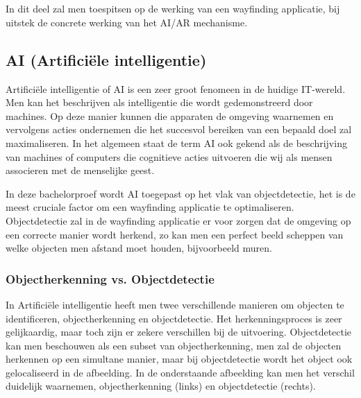 \chapter{}
\label{ch:stand-van-zaken}




In dit deel zal men toespitsen op de werking van een wayfinding applicatie, bij uitstek de concrete werking van het AI/AR mechanisme.

\section{AI (Artificiële intelligentie)}
Artificiële intelligentie of AI is een zeer groot fenomeen in de huidige IT-wereld. Men kan het beschrijven als intelligentie die wordt gedemonstreerd door machines. Op deze manier kunnen die apparaten de omgeving waarnemen en vervolgens acties ondernemen die het succesvol bereiken van een bepaald doel zal maximaliseren. In het algemeen staat de term AI ook gekend als de beschrijving van machines of computers die cognitieve acties uitvoeren die wij als mensen associeren met de menselijke geest. 

In deze bachelorproef wordt AI toegepast op het vlak van objectdetectie, het is de meest cruciale factor om een wayfinding applicatie te optimaliseren.
Objectdetectie zal in de wayfinding applicatie er voor zorgen dat de omgeving op een correcte manier wordt herkend, zo kan men een perfect beeld scheppen van welke objecten men afstand moet houden, bijvoorbeeld muren.

\subsection{Objectherkenning vs. Objectdetectie}
In Artificiële intelligentie heeft men twee verschillende manieren om objecten te identificeren, objectherkenning en objectdetectie. Het herkenningsproces is zeer gelijkaardig, maar toch zijn er zekere verschillen bij de uitvoering. Objectdetectie kan men beschouwen als een subset van objectherkenning, men zal de objecten herkennen op een simultane manier, maar bij objectdetectie wordt het object ook gelocaliseerd in de afbeelding. In de onderstaande afbeelding kan men het verschil duidelijk waarnemen, objectherkenning (links) en objectdetectie (rechts).

